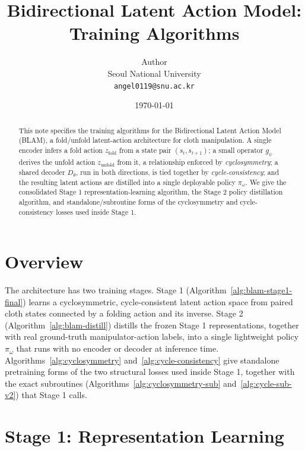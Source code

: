 \documentclass[11pt]{article}
\title{Bidirectional Latent Action Model:\\Training Algorithms}
\author{Author\\Seoul National University\\\texttt{angel0119@snu.ac.kr}}
\date{\today}
\begin{document}
\maketitle

\begin{abstract}
This note specifies the training algorithms for the Bidirectional Latent
Action Model (BLAM), a fold/unfold latent-action architecture for cloth
manipulation. A single encoder infers a fold action $z_{\text{fold}}$ from a
state pair $(s_t, s_{t+1})$; a small operator $g_\psi$ derives the unfold
action $z_{\text{unfold}}$ from it, a relationship enforced by
\emph{cyclosymmetry}; a shared decoder $D_\theta$, run in both directions, is
tied together by \emph{cycle-consistency}; and the resulting latent actions
are distilled into a single deployable policy $\pi_\omega$. We give the
consolidated Stage 1 representation-learning algorithm, the Stage 2 policy
distillation algorithm, and standalone/subroutine forms of the cyclosymmetry
and cycle-consistency losses used inside Stage 1.
\end{abstract}

\section{Overview}
\label{sec:overview}

The architecture has two training stages. Stage 1
(Algorithm~\ref{alg:blam-stage1-final}) learns a cyclosymmetric,
cycle-consistent latent action space from paired cloth states connected by a
folding action and its inverse. Stage 2 (Algorithm~\ref{alg:blam-distill})
distills the frozen Stage 1 representations, together with real
ground-truth manipulator-action labels, into a single lightweight policy
$\pi_\omega$ that runs with no encoder or decoder at inference time.
Algorithms~\ref{alg:cyclosymmetry} and~\ref{alg:cycle-consistency} give
standalone pretraining forms of the two structural losses used inside Stage
1, together with the exact subroutines
(Algorithms~\ref{alg:cyclosymmetry-sub} and~\ref{alg:cycle-sub-v2}) that
Stage 1 calls.

\section{Stage 1: Representation Learning}
\label{sec:stage1}
\end{document}
